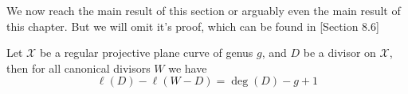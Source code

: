 %

We now reach the main result of this section or arguably even the main result of this chapter. But we will omit it's proof, which can be found in \cite{Fulton}[Section 8.6]

\begin{theorem}\label{thm:reimann_roch}
  Let $\mathcal{X}$ be a regular projective plane curve of genus $g$, and $D$ be a divisor on $\mathcal{X}$, then for all canonical divisors $W$ we have
  \begin{equation*}
    \ell(D) - \ell(W - D) = \deg(D) - g + 1
  \end{equation*}
\end{theorem}


